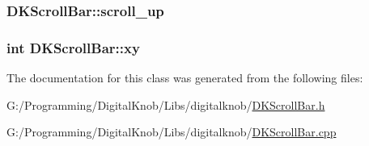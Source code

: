 \hypertarget{class_d_k_scroll_bar_a7022e7bc1eafa6f29375229fa93f6b07}{
\subsubsection[{scroll\-\_\-up}]{ D\-K\-Scroll\-Bar\-::scroll\-\_\-up}}\label{class_d_k_scroll_bar_a7022e7bc1eafa6f29375229fa93f6b07}
\hypertarget{class_d_k_scroll_bar_ae87dae10a6c4d78c98f8898cb58a7010}{
\subsubsection[{xy}]{\setlength{\rightskip}{0pt plus 5cm}int D\-K\-Scroll\-Bar\-::xy}}\label{class_d_k_scroll_bar_ae87dae10a6c4d78c98f8898cb58a7010}


The documentation for this class was generated from the following files\-:\begin{DoxyCompactItemize}
\item 
G\-:/\-Programming/\-Digital\-Knob/\-Libs/digitalknob/\hyperlink{_d_k_scroll_bar_8h}{D\-K\-Scroll\-Bar.\-h}\item 
G\-:/\-Programming/\-Digital\-Knob/\-Libs/digitalknob/\hyperlink{_d_k_scroll_bar_8cpp}{D\-K\-Scroll\-Bar.\-cpp}\end{DoxyCompactItemize}
